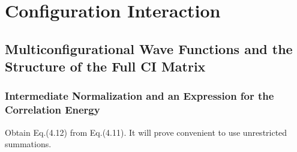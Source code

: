 \documentclass[a4paper]{book}
\begin{document}

	\chapter{Configuration Interaction}
	
	\section{Multiconfigurational Wave Functions and the Structure of the Full CI Matrix}
	
	\subsection{Intermediate Normalization and an Expression for the Correlation Energy}
	
	\begin{exercise}
	Obtain Eq.(4.12) from Eq.(4.11). It will prove convenient to use unrestricted summations.
	\end{exercise}
	
\end{document}
